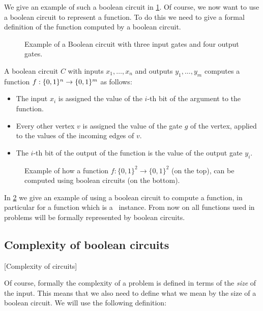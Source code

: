 We give an example of such a boolean circuit in \cref{fig:boolean_circuit_example}. Of course, we now want to use a boolean circuit to represent a function. To do this we need to give a formal definition of the function computed by a boolean circuit.

\begin{figure}
    \centering
    \caption[Example of a Boolean Circuit]{Example of a Boolean circuit with three input gates and four output gates.}
    \label{fig:boolean_circuit_example}
\end{figure}

\begin{definition}
    A boolean circuit $C$ with inputs $x_1, \dots, x_n$ and outputs $y_1, \dots, y_m$ computes a function $f : \{0, 1\}^n \rightarrow \{0, 1\}^m$ as follows:
    \begin{itemize}
        \item The input $x_i$ is assigned the value of the $i$-th bit of the argument to the function.
        \item Every other vertex $v$ is assigned the value of the gate $g$ of the vertex, applied to the values of the incoming edges of $v$.
        \item The $i$-th bit of the output of the function is the value of the output gate $y_i$.
    \end{itemize}
\end{definition}

\begin{figure}
    \centering
    \caption[Computing a function with circuits]{Example of how a function $f : \{0, 1\}^2 \rightarrow \{0, 1\}^2$ (on the top), can be computed using boolean circuits (on the bottom).}
    \label{fig:computing_function_example}
\end{figure}

In \cref{fig:computing_function_example} we give an example of using a boolean circuit to compute a function, in particular for a function which is a \Tarski\ instance. From now on all functions used in problems will be formally represented by boolean circuits.

\subsection{Complexity of boolean circuits}[Complexity of circuits]

Of course, formally the complexity of a problem is defined in terms of the \emph{size} of the input. This means that we also need to define what we mean by the size of a boolean circuit. We will use the following definition:

